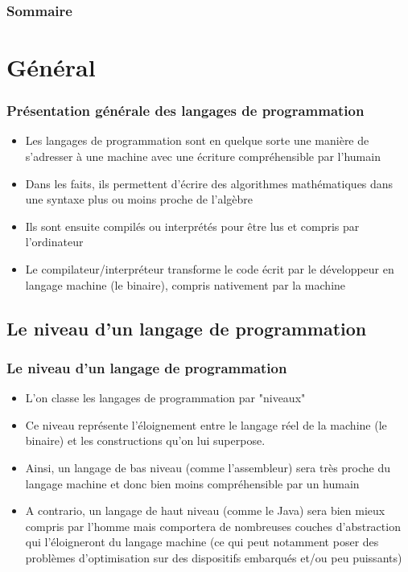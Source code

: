 \documentclass{beamer}
\begin{document}
 

	\begin{frame}
	\frametitle{Sommaire}
	\tableofcontents
	\end{frame} 
	
	\section{Général}
	\begin{frame}
	\frametitle{Présentation générale des langages de programmation}
	\begin{itemize}
		\item Les langages de programmation sont en quelque sorte une manière de s'adresser à une machine avec une écriture compréhensible par l'humain
		\pause 
		\item Dans les faits, ils permettent d'écrire des algorithmes mathématiques dans une syntaxe plus ou moins proche de l'algèbre
		\pause 
		\item Ils sont ensuite compilés ou interprétés pour être lus et compris par l'ordinateur
		\pause
		\item Le compilateur/interpréteur transforme le code écrit par le développeur en langage machine (le binaire), compris nativement par la machine		 
	\end{itemize}
	\end{frame}
	
	\subsection{Le niveau d'un langage de programmation}
	\begin{frame}
	\frametitle{Le niveau d'un langage de programmation}
	\begin{itemize}
		\item L'on classe les langages de programmation par "niveaux"
		\pause
		\item Ce niveau représente l'éloignement entre le langage réel de la machine (le binaire) et les constructions qu'on lui superpose.
		\pause
		\item Ainsi, un langage de bas niveau (comme l'assembleur) sera très proche du langage machine et donc bien moins  compréhensible par un humain
		\pause
		\item A contrario, un langage de haut niveau (comme le Java) sera bien mieux compris par l'homme mais comportera de nombreuses couches d'abstraction qui l'éloigneront du langage machine (ce qui peut notamment poser des problèmes d'optimisation sur des dispositifs embarqués et/ou peu puissants)
	\end{itemize}
	\end{frame}
	
\end{document}
